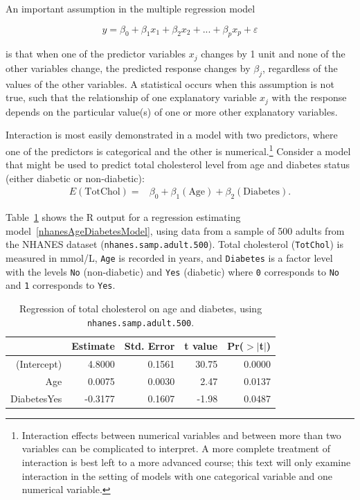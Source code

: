 An important assumption in the multiple regression model

\[y = \beta_0 + \beta_1x_1 + \beta_2x_2 + ... + \beta_px_p + \varepsilon \] 

is that when one of the predictor variables $x_j$ changes by 1 unit and none of the other variables change, the predicted response changes by $\beta_j$, regardless of the values of the other variables.  A statistical  occurs when this assumption is not true, such that the relationship of one explanatory variable $x_j$ with the response depends on the particular value(s) of one or more other explanatory variables.

Interaction is most easily demonstrated in a model with two predictors, where one of the predictors is categorical and the other is numerical.\footnote{Interaction effects between numerical variables and between more than two variables can be complicated to interpret. A more complete treatment of interaction is best left to a more advanced course; this text will only examine interaction in the setting of models with one categorical variable and one numerical variable.} Consider a model that might be used to predict total cholesterol level from age and diabetes status (either diabetic or non-diabetic):
\begin{align}
E(\text{TotChol}) =& \beta_0 + \beta_1(\text{Age}) + \beta_2(\text{Diabetes}).
\label{nhanesAgeDiabetesModel}
\end{align}

Table~\ref{nhanesAgeDiabetes} shows the \textsf{R} output for a regression estimating model~\ref{nhanesAgeDiabetesModel}, using data from a sample of 500 adults from the NHANES dataset (\texttt{nhanes.samp.adult.500}). Total cholesterol (\texttt{TotChol}) is measured in mmol/L, \texttt{Age} is recorded in years, and \texttt{Diabetes} is a factor level with the levels \texttt{No} (non-diabetic) and \texttt{Yes} (diabetic) where \texttt{0} corresponds to \texttt{No} and \texttt{1} corresponds to \texttt{Yes}.

\begin{table}[ht]
	\centering
	\begin{tabular}{rrrrr}
		\hline
		& Estimate & Std. Error & t value & Pr($>$$|$t$|$) \\ 
		\hline
		(Intercept) & 4.8000 & 0.1561 & 30.75 & 0.0000 \\ 
		Age & 0.0075 & 0.0030 & 2.47 & 0.0137 \\ 
		DiabetesYes & -0.3177 & 0.1607 & -1.98 & 0.0487 \\ 
		\hline
	\end{tabular}
	\caption{Regression of total cholesterol on age and diabetes, 
		using \texttt{nhanes.samp.adult.500}.} 
	\label{nhanesAgeDiabetes}
\end{table}

